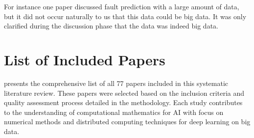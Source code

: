\documentclass[acmsmall]{acmart}
\begin{document}
For instance one paper discussed fault prediction with a large amount of data, but it did not occur naturally to us that this data could be big data. It was only clarified during the discussion phase that the data was indeed big data.




\appendix
\section{List of Included Papers}\label{app:list-of-included-papers}
 presents the comprehensive list of all 77 papers included in this systematic literature review. These papers were selected based on the inclusion criteria and quality assessment process detailed in the methodology. Each study contributes to the understanding of computational mathematics for AI with focus on numerical methods and distributed computing techniques for deep learning on big data.


\end{document}
